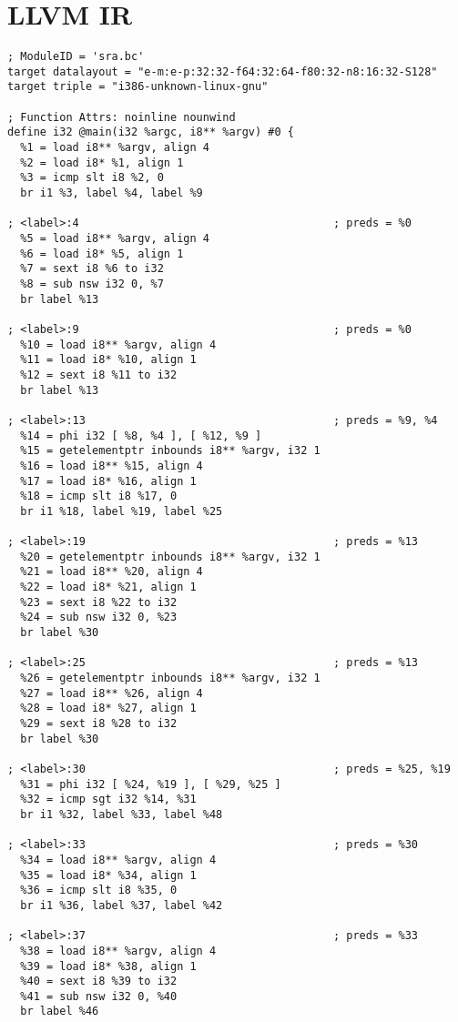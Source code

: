 \section{LLVM IR}
\lstset{language=LLVM,style=Cstyle}
\begin{lstlisting}[caption={Intermediate Representation from LLVM.}, label={lst:llvmir}]
; ModuleID = 'sra.bc'
target datalayout = "e-m:e-p:32:32-f64:32:64-f80:32-n8:16:32-S128"
target triple = "i386-unknown-linux-gnu"

; Function Attrs: noinline nounwind
define i32 @main(i32 %argc, i8** %argv) #0 {
  %1 = load i8** %argv, align 4
  %2 = load i8* %1, align 1
  %3 = icmp slt i8 %2, 0
  br i1 %3, label %4, label %9

; <label>:4                                       ; preds = %0
  %5 = load i8** %argv, align 4
  %6 = load i8* %5, align 1
  %7 = sext i8 %6 to i32
  %8 = sub nsw i32 0, %7
  br label %13

; <label>:9                                       ; preds = %0
  %10 = load i8** %argv, align 4
  %11 = load i8* %10, align 1
  %12 = sext i8 %11 to i32
  br label %13

; <label>:13                                      ; preds = %9, %4
  %14 = phi i32 [ %8, %4 ], [ %12, %9 ]
  %15 = getelementptr inbounds i8** %argv, i32 1
  %16 = load i8** %15, align 4
  %17 = load i8* %16, align 1
  %18 = icmp slt i8 %17, 0
  br i1 %18, label %19, label %25

; <label>:19                                      ; preds = %13
  %20 = getelementptr inbounds i8** %argv, i32 1
  %21 = load i8** %20, align 4
  %22 = load i8* %21, align 1
  %23 = sext i8 %22 to i32
  %24 = sub nsw i32 0, %23
  br label %30

; <label>:25                                      ; preds = %13
  %26 = getelementptr inbounds i8** %argv, i32 1
  %27 = load i8** %26, align 4
  %28 = load i8* %27, align 1
  %29 = sext i8 %28 to i32
  br label %30

; <label>:30                                      ; preds = %25, %19
  %31 = phi i32 [ %24, %19 ], [ %29, %25 ]
  %32 = icmp sgt i32 %14, %31
  br i1 %32, label %33, label %48

; <label>:33                                      ; preds = %30
  %34 = load i8** %argv, align 4
  %35 = load i8* %34, align 1
  %36 = icmp slt i8 %35, 0
  br i1 %36, label %37, label %42

; <label>:37                                      ; preds = %33
  %38 = load i8** %argv, align 4
  %39 = load i8* %38, align 1
  %40 = sext i8 %39 to i32
  %41 = sub nsw i32 0, %40
  br label %46


\end{lstlisting}
